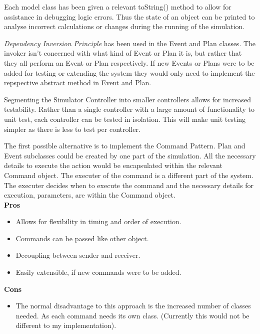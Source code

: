 \documentclass{worksheet}
\begin{document}
	Each model class has been given a relevant toString() method to allow for assistance in debugging logic errors. Thus the state of an object can be printed to analyse incorrect calculations or changes during the running of the simulation. 
	
	\textit{Dependency Inversion Principle} has been used in the Event and Plan classes. The invoker isn't concerned with what kind of Event or Plan it is, but rather that they all perform an Event or Plan respectively. If new Events or Plans were to be added for testing or extending the system they would only need to implement the repspective abstract method in Event and Plan.
	
	Segmenting the Simulator Controller into smaller controllers allows for increased testability. Rather than a single controller with a large amount of functionality to unit test, each controller can be tested in isolation. This will make unit testing simpler as there is less to test per controller. 
	
%
%

	
	The first possible alternative is to implement the Command Pattern. Plan and Event subclasses could be created by one part of the simulation. All the necessary details to execute the action would be encapsulated within the relevant Command object. The executer of the command is a different part of the system. The executer decides when to execute the command and the necessary details for execution, parameters, are within the Command object.  \\
   
	\textbf{Pros}
	\begin{itemize}
		\item Allows for flexibility in timing and order of execution.
		\item Commands can be passed like other object. 
		\item Decoupling between sender and receiver.
		\item Easily extensible, if new commands were to be added.
	\end{itemize}
	\textbf{Cons}
	\begin{itemize}
		\item The normal disadvantage to this approach is the increased number of classes needed. As each command needs its own class. (Currently this would not be different to my implementation).
	\end{itemize}	
	
\end{document}
